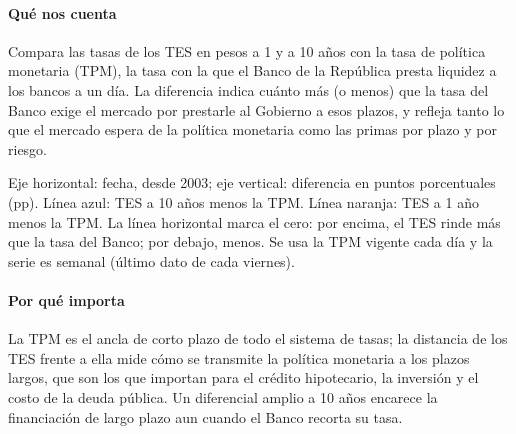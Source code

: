 \paragraph{Qué nos cuenta}
Compara las tasas de los TES en pesos a 1 y a 10 años con la tasa de política monetaria (TPM), la tasa con la que el Banco de la República presta liquidez a los bancos a un día. La diferencia indica cuánto más (o menos) que la tasa del Banco exige el mercado por prestarle al Gobierno a esos plazos, y refleja tanto lo que el mercado espera de la política monetaria como las primas por plazo y por riesgo.

\begin{leer}
Eje horizontal: fecha, desde 2003; eje vertical: diferencia en puntos porcentuales (pp). Línea azul: TES a 10 años menos la TPM. Línea naranja: TES a 1 año menos la TPM. La línea horizontal marca el cero: por encima, el TES rinde más que la tasa del Banco; por debajo, menos. Se usa la TPM vigente cada día y la serie es semanal (último dato de cada viernes).
\end{leer}

\paragraph{Por qué importa}
La TPM es el ancla de corto plazo de todo el sistema de tasas; la distancia de los TES frente a ella mide cómo se transmite la política monetaria a los plazos largos, que son los que importan para el crédito hipotecario, la inversión y el costo de la deuda pública. Un diferencial amplio a 10 años encarece la financiación de largo plazo aun cuando el Banco recorta su tasa.

